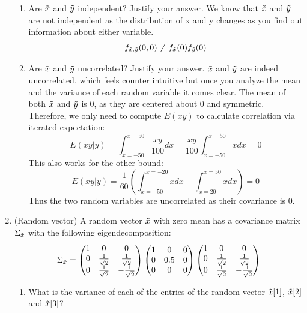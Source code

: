 \documentclass[12pt,twoside]{article}
\newcommand{\ry}{\rnd{ y}  }
\newcommand{\rx}{\rnd{ x}  }
\newcommand{\rnd}{\Tilde}
\begin{document}
\begin{enumerate}
\begin{enumerate}
\item Are $\rx$ and $\ry$ independent? Justify your answer. 
\subitem We know that $\rx$ and $\ry$ are not independent as the distribution of x and y changes as you find out information about either variable.
$$
    f_{\rx,\ry}(0,0) \neq f_{\rx}(0) f_{\ry}(0)
$$
\item Are $\rx$ and $\ry$ uncorrelated? Justify your answer. 
\subitem $\rx$ and $\ry$ are indeed uncorrelated, which feels counter intuitive but once you analyze the mean and the variance of each random variable it comes clear. The mean of both $\rx$ and $\ry$ is 0, as they are centered about 0 and symmetric. Therefore, we only need to compute $E(xy)$ to calculate correlation via iterated expectation:
$$
    E(xy|y) = \int_{x=-50}^{x=50} \frac{xy}{100}dx = \frac{xy}{100}\int_{x=-50}^{x=50} xdx = 0
$$
This also works for the other bound: 
$$
    E(xy|y) = \frac{1}{60} (\int_{x=-50}^{x=-20} xdx + \int_{x=20}^{x=50} xdx)  = 0 
$$
Thus the two random variables are uncorrelated as their covariance is 0. 
\end{enumerate}

\item (Random vector) 
A random vector $\rx$ with zero mean has a covariance matrix $\Sigma_{\rx}$ with the following eigendecomposition:
\begin{equation}
\Sigma_{\rx} = 
  \begin{pmatrix}
1 & 0 & 0 \\ 
0 & \frac{1}{\sqrt{2}} & \frac{1}{\sqrt{2}} \\
0 & \frac{1}{\sqrt{2}} & -\frac{1}{\sqrt{2}} 
\end{pmatrix}
\begin{pmatrix}
1 & 0 & 0 \\ 
0 & 0.5 & 0 \\ 
0 & 0 & 0
\end{pmatrix} 
\begin{pmatrix} 1 & 0 & 0 \\ 
0 & \frac{1}{\sqrt{2}} & \frac{1}{\sqrt{2}} \\ 
0 & \frac{1}{\sqrt{2}} & -\frac{1}{\sqrt{2}} 
\end{pmatrix}  
\end{equation}

\begin{enumerate}
\item What is the variance of each of the entries of the random vector $\rx[1]$, $\rx[2]$ and $\rx[3]$?


\end{enumerate}
\end{enumerate}
\end{document}
